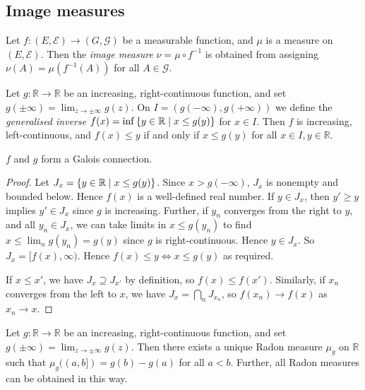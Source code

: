 \subsection{Image measures}
\begin{definition}
	Let \( f \colon (E,\mathcal E) \to (G,\mathcal G) \) be a measurable function, and \( \mu \) is a measure on \( (E, \mathcal E) \).
	Then the \emph{image measure} \( \nu = \mu \circ f^{-1} \) is obtained from assigning \( \nu(A) = \mu(f^{-1}(A)) \) for all \( A \in \mathcal G \).
\end{definition}
\begin{lemma}
	Let \( g \colon \mathbb R \to \mathbb R \) be an increasing, right-continuous function, and set \( g(\pm\infty) = \lim_{z \to \pm \infty} g(z) \).
	On \( I = (g(-\infty), g(+\infty)) \) we define the \emph{generalised inverse} \( f(x) = \inf \qty{y \in \mathbb R \mid x \leq g(y)} \) for \( x \in I \).
	Then \( f \) is increasing, left-continuous, and \( f(x) \leq y \) if and only if \( x \leq g(y) \) for all \( x \in I, y \in \mathbb R \).
\end{lemma}
\begin{remark}
	\( f \) and \( g \) form a Galois connection.
\end{remark}
\begin{proof}
	Let \( J_x = \qty{y \in \mathbb R \mid x \leq g(y)} \).
	Since \( x > g(-\infty) \), \( J_x \) is nonempty and bounded below.
	Hence \( f(x) \) is a well-defined real number.
	If \( y \in J_x \), then \( y' \geq y \) implies \( y' \in J_x \) since \( g \) is increasing.
	Further, if \( y_n \) converges from the right to \( y \), and all \( y_n \in J_x \), we can take limits in \( x \leq g(y_n) \) to find \( x \leq \lim_n g(y_n) = g(y) \) since \( g \) is right-continuous.
	Hence \( y \in J_x \).
	So \( J_x = [f(x), \infty) \).
	Hence \( f(x) \leq y \iff x \leq g(y) \) as required.

	If \( x \leq x' \), we have \( J_x \supseteq J_{x'} \) by definition, so \( f(x) \leq f(x') \).
	Similarly, if \( x_n \) converges from the left to \( x \), we have \( J_x = \bigcap_n J_{x_n} \), so \( f(x_n) \to f(x) \) as \( x_n \to x \).
\end{proof}
\begin{theorem}
	Let \( g \colon \mathbb R \to \mathbb R \) be an increasing, right-continuous function, and set \( g(\pm\infty) = \lim_{z \to \pm \infty} g(z) \).
	Then there exists a unique Radon measure \( \mu_g \) on \( \mathbb R \) such that \( \mu_g((a,b]) = g(b) - g(a) \) for all \( a < b \).
	Further, all Radon measures can be obtained in this way.
\end{theorem}

